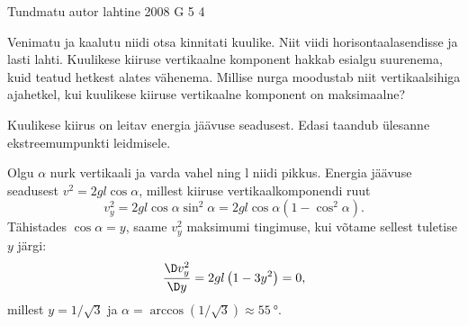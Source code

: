 {Tundmatu autor} %
{lahtine} %
{2008} %
{G 5} %
{4} %
{
\ifStatement
Venimatu ja kaalutu niidi otsa kinnitati kuulike.
Niit viidi horisontaalasendisse ja lasti lahti. Kuulikese kiiruse vertikaalne komponent
hakkab esialgu suurenema, kuid teatud hetkest alates vähenema. Millise nurga moodustab niit vertikaalsihiga ajahetkel, kui kuulikese kiiruse vertikaalne komponent on
maksimaalne?
\fi


\ifHint
Kuulikese kiirus on leitav energia jäävuse seadusest. Edasi taandub ülesanne ekstreemumpunkti leidmisele.
\fi


\ifSolution
Olgu $\alpha$ nurk vertikaali ja varda vahel ning l niidi pikkus. Energia jäävuse seadusest
$v^2 = 2gl \cos \alpha$, millest kiiruse vertikaalkomponendi ruut
\[
v_{y}^{2}=2 g l \cos \alpha \sin ^{2} \alpha=2 g l \cos \alpha\left(1-\cos ^{2} \alpha\right).
\]
Tähistades $\cos \alpha = y$, saame $v_y^2$ maksimumi tingimuse, kui võtame sellest tuletise $y$ järgi:
\[
\frac{\D v_{y}^{2}}{\D y}=2 g l\left( 1-3 y^{2}\right)=0,
\]
millest $y = 1/ \sqrt 3$ ja $\alpha = \arccos \left( 1/ \sqrt 3\right) \approx \SI{55}{\degree}$.

\vspace{0.5\baselineskip}

}
